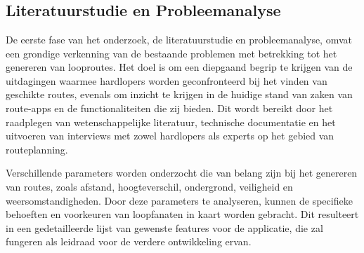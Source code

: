 
\chapter{}%
\label{ch:methodologie}



\section{Literatuurstudie en Probleemanalyse}

De eerste fase van het onderzoek, de literatuurstudie en probleemanalyse, omvat een grondige verkenning van de bestaande problemen met betrekking tot het genereren van looproutes. 
Het doel is om een diepgaand begrip te krijgen van de uitdagingen waarmee hardlopers worden geconfronteerd bij het vinden van geschikte routes, 
evenals om inzicht te krijgen in de huidige stand van zaken van route-apps en de functionaliteiten die zij bieden. Dit wordt bereikt door het raadplegen van wetenschappelijke literatuur, 
technische documentatie en het uitvoeren van interviews met zowel hardlopers als experts op het gebied van routeplanning.

Verschillende parameters worden onderzocht die van belang zijn bij het genereren van routes, zoals afstand, hoogteverschil, ondergrond, veiligheid en weersomstandigheden. 
Door deze parameters te analyseren, kunnen de specifieke behoeften en voorkeuren van loopfanaten in kaart worden gebracht. Dit resulteert in een gedetailleerde lijst van gewenste features voor de applicatie,
die zal fungeren als leidraad voor de verdere ontwikkeling ervan.

